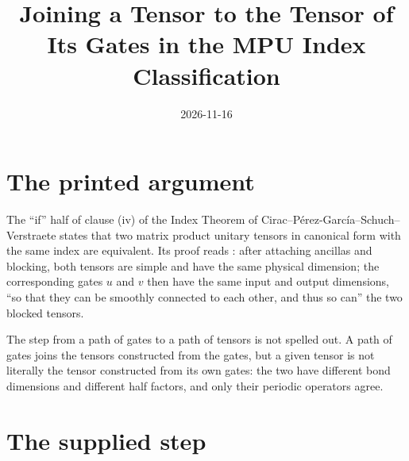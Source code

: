 \documentclass{article}
\title{Joining a Tensor to the Tensor of Its Gates in the MPU Index Classification}
\author{}
\date{2026-11-16}
\begin{document}
\maketitle
{}

\section{The printed argument}

The ``if'' half of clause (iv) of the Index Theorem of
Cirac--P\'erez-Garc\'ia--Schuch--Verstraete states that two matrix product
unitary tensors in canonical form with the same index are equivalent. Its
proof reads \cite[lines~857--865]{Cirac2017MPU}: after attaching ancillas and
blocking, both tensors are simple and have the same physical dimension; the
corresponding gates $u$ and $v$ then have the same input and output
dimensions, ``so that they can be smoothly connected to each other, and thus
so can'' the two blocked tensors.

The step from a path of gates to a path of tensors is not spelled out. A
path of gates joins the tensors constructed from the gates, but a given
tensor is not literally the tensor constructed from its own gates: the two
have different bond dimensions and different half factors, and only their
periodic operators agree.

\section{The supplied step}
\end{document}
